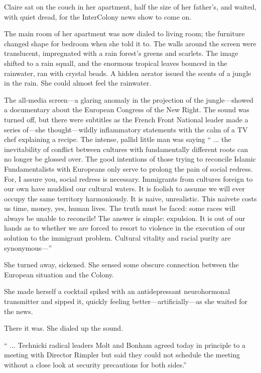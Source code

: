 Claire sat on the couch in her apartment, half the size of her father's, and waited, with quiet dread, for the InterColony news show to come on.

The main room of her apartment was now dialed to living room; the furniture changed shape for bedroom when she told it to. The walls around the screen were translucent, impregnated with a rain forest's greens and scarlets. The image shifted to a rain squall, and the enormous tropical leaves bounced in the rainwater, ran with crystal beads. A hidden aerator issued the scents of a jungle in the rain. She could almost feel the rainwater.

The all-media screen—a glaring anomaly in the projection of the jungle—showed a documentary about the European Congress of the New Right. The sound was turned off, but there were subtitles as the French Front National leader made a series of—she thought—wildly inflammatory statements with the calm of a TV chef explaining a recipe. The intense, pallid little man was saying `` ... the inevitability of conflict between cultures with fundamentally different roots can no longer be glossed over. The good intentions of those trying to reconcile Islamic Fundamentalists with Europeans only serve to prolong the pain of social redress. For, I assure you, social redress is necessary. Immigrants from cultures foreign to our own have muddied our cultural waters. It is foolish to assume we will ever occupy the same territory harmoniously. It is naive, unrealistic. This naivete costs us time, money, yes, human lives. The truth must be faced: some races will always be unable to reconcile! The answer is simple: expulsion. It is out of our hands as to whether we are forced to resort to violence in the execution of our solution to the immigrant problem. Cultural vitality and racial purity are synonymous—''

She turned away, sickened. She sensed some obscure connection between the European situation and the Colony.

She made herself a cocktail spiked with an antidepressant neurohormonal transmitter and sipped it, quickly feeling better—artificially—as she waited for the news.

There it was. She dialed up the sound.

`` ... Technicki radical leaders Molt and Bonham agreed today in principle to a meeting with Director Rimpler but said they could not schedule the meeting without a close look at security precautions for both sides.''

